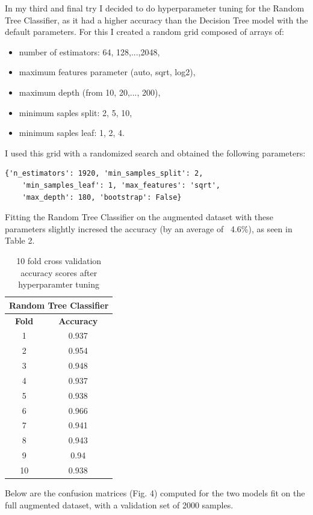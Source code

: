 \documentclass{article}
\begin{document}
In my third and final try I decided to do hyperparameter tuning for the Random Tree Classifier, as it had a higher accuracy than the Decision Tree model with the default parameters. For this I created a random grid composed of arrays of:
\begin{itemize}
\item number of estimators: 64, 128,...,2048,
\item maximum features parameter (auto, sqrt, log2),
\item maximum depth (from 10, 20,..., 200), 
\item minimum saples split: 2, 5, 10,
\item minimum saples leaf: 1, 2, 4.
\end{itemize} 

I used this grid with a randomized search and obtained the following parameters: 
\begin{verbatim}
{'n_estimators': 1920, 'min_samples_split': 2,
	'min_samples_leaf': 1, 'max_features': 'sqrt',
	'max_depth': 180, 'bootstrap': False}
\end{verbatim}

Fitting the Random Tree Classifier on the augmented dataset with these parameters slightly incresed the accuracy (by an average of ~4.6\%), as seen in Table 2.

\begin{table}[h]
	\centering
	\caption{10 fold cross validation accuracy scores after hyperparamter tuning}
	\label{table1}
	\begin{tabular}{cc}
		\bottomrule
		\multicolumn{2}{|c|}{\textbf{Random Tree Classifier}} \\
		\toprule
		\textbf{Fold} & \textbf{Accuracy} \\
		\midrule
		1 & 0.937 \\
		2 & 0.954 \\
		3 & 0.948 \\
		4 & 0.937 \\
		5 & 0.938 \\
		6 & 0.966 \\
		7 & 0.941 \\
		8 & 0.943 \\
		9 & 0.94 \\
		10 & 0.938 \\
 		\bottomrule
	\end{tabular}
\end{table}

Below are the confusion matrices (Fig. 4) computed for the two models fit on the full augmented dataset, with a validation set of 2000 samples.
\end{document}
